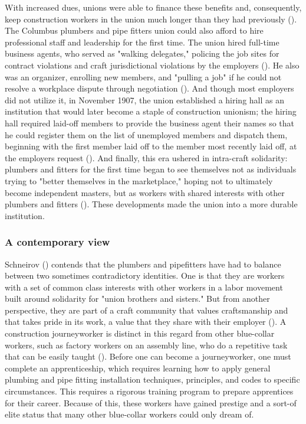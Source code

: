 \documentclass[12pt]{article}
\begin{document}
With increased dues, unions were able to finance these benefits and, consequently, keep construction workers in the union much longer than they had previously (\cite[59]{schneirovPrideSolidarityHistory1993}). The Columbus plumbers and pipe fitters union could also afford to hire professional staff and leadership for the first time. The union hired full-time business agents, who served as "walking delegates," policing the job sites for contract violations and craft jurisdictional violations by the employers (\citeyear[60]{schneirovPrideSolidarityHistory1993}). He also was an organizer, enrolling new members, and "pulling a job" if he could not resolve a workplace dispute through negotiation (\citeyear[60]{schneirovPrideSolidarityHistory1993}). And though most employers did not utilize it, in November 1907, the union established a hiring hall as an institution that would later become a staple of construction unionism; the hiring hall required laid-off members to provide the business agent their names so that he could register them on the list of unemployed members and dispatch them, beginning with the first member laid off to the member most recently laid off, at the employers request (\citeyear[60–61]{schneirovPrideSolidarityHistory1993}). And finally, this era ushered in intra-craft solidarity: plumbers and fitters for the first time began to see themselves not as individuals trying to "better themselves in the marketplace," hoping not to ultimately become independent masters, but as workers with shared interests with other plumbers and fitters (\citeyear[61]{schneirovPrideSolidarityHistory1993}). These developments made the union into a more durable institution.

\subsubsection{A contemporary view}

Schneirov (\citeyear{schneirovPrideSolidarityHistory1993}) contends that the plumbers and pipefitters have had to balance between two sometimes contradictory identities. One is that they are workers with a set of common class interests with other workers in a labor movement built around solidarity for "union brothers and sisters." But from another perspective, they are part of a craft community that values craftsmanship and that takes pride in its work, a value that they share with their employer  (\cite[3--4]{schneirovPrideSolidarityHistory1993}). A construction journeyworker is distinct in this regard from other blue-collar workers, such as factory workers on an assembly line, who do a repetitive task that can be easily taught (\cite[5]{schneirovPrideSolidarityHistory1993}). Before one can become a journeyworker, one must complete an apprenticeship, which requires learning how to apply general plumbing and pipe fitting installation techniques, principles, and codes to specific circumstances. This requires a rigorous training program to prepare apprentices for their career. Because of this, these workers have gained prestige and a sort-of elite status that many other blue-collar workers could only dream of.
\end{document}
